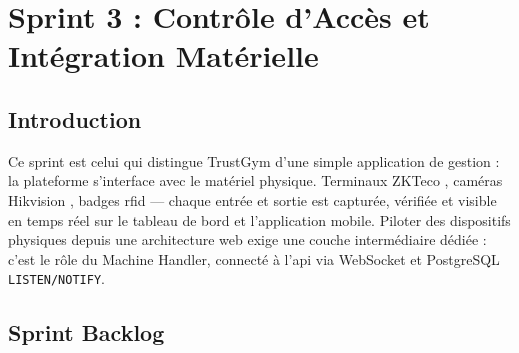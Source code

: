 ﻿\documentclass[../main.tex]{subfiles}
\begin{document}
\chapter{Sprint 3 : Contr\^{o}le d'Acc\`{e}s et Int\'{e}gration Mat\'{e}rielle}

\section{Introduction}

Ce sprint est celui qui distingue TrustGym d'une simple application de gestion : la plateforme s'interface avec le mat\'{e}riel physique. Terminaux ZKTeco \cite{zkteco}, cam\'{e}ras Hikvision \cite{hikvision}, badges \acrshort{rfid} --- chaque entr\'{e}e et sortie est captur\'{e}e, v\'{e}rifi\'{e}e et visible en temps r\'{e}el sur le tableau de bord et l'application mobile. Piloter des dispositifs physiques depuis une architecture web exige une couche interm\'{e}diaire d\'{e}di\'{e}e : c'est le r\^{o}le du Machine Handler, connect\'{e} \`{a} l'\acrshort{api} via WebSocket \cite{socketio} et PostgreSQL \texttt{LISTEN/NOTIFY}.

\section{Sprint Backlog}
\end{document}
